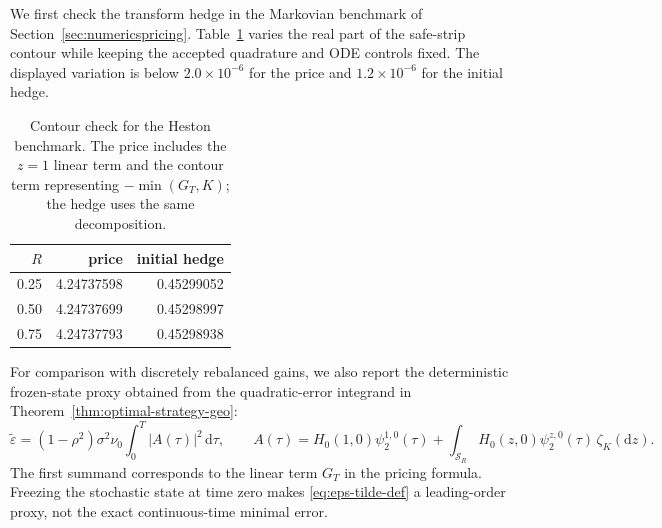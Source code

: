 \documentclass[10pt,a4paper,reqno]{amsart}
\theoremstyle{plain}
\theoremstyle{definition}
\theoremstyle{remark}
\theoremstyle{example}
\begin{document}
We first check the transform hedge in the Markovian benchmark of
Section~\ref{sec:numericspricing}.  Table~\ref{tab:contour_validation} varies the real part of the
safe-strip contour while keeping the accepted quadrature and ODE controls fixed.  The displayed
variation is below \(2.0\times10^{-6}\) for the price and \(1.2\times10^{-6}\) for the initial
hedge. 

 \begin{table}[htbp]
\centering
\small
\begin{tabular}{rrr}
\toprule
\(R\) & price & initial hedge \\
\midrule
0.25 & 4.24737598 & 0.45299052 \\
0.50 & 4.24737699 & 0.45298997 \\
0.75 & 4.24737793 & 0.45298938 \\
\bottomrule
\end{tabular}
\caption{Contour check for the Heston benchmark.  The price includes the \(z=1\)
linear term and the contour term representing \(-\min(G_T,K)\); the hedge uses the same
decomposition.}
\label{tab:contour_validation}
\end{table}

For comparison with discretely rebalanced gains, we also report the deterministic frozen-state
proxy obtained from the quadratic-error integrand in Theorem~\ref{thm:optimal-strategy-geo}:
\begin{equation}\label{eq:eps-tilde-def}
 \widetilde\varepsilon
  =(1-\rho^2)\sigma^2\nu_0\int_0^T|A(\tau)|^2\,\mathrm d\tau,
 \qquad
 A(\tau)=H_0(1,0)\psi_2^{1,0}(\tau)
 +\int_{\mathcal S_R}H_0(z,0)\psi_2^{z,0}(\tau)\,\zeta_K(\mathrm dz).
\end{equation}
The first summand corresponds to the linear term $G_T$ in the pricing formula. Freezing the stochastic state at time zero makes \eqref{eq:eps-tilde-def} a leading-order proxy, not the exact continuous-time minimal error.
\end{document}
